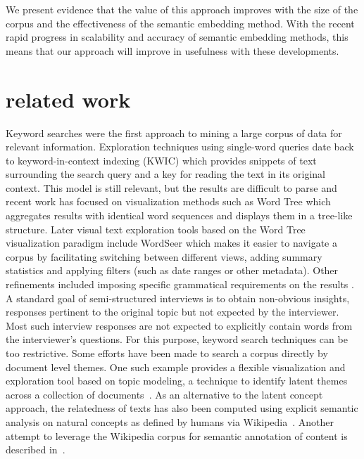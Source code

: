 \documentclass{sigchi}
\begin{document}
We present evidence that the value of this approach improves with the size of the corpus and the
effectiveness of the semantic embedding method. With the recent rapid progress in scalability and
accuracy of semantic embedding methods, this means that our approach will improve in usefulness
with these developments. 

\section{related work}

Keyword searches were the first approach to mining a large corpus of data for relevant information. Exploration techniques using single-word queries date back to keyword-in-context indexing (KWIC) \cite{luhn60, fischer66} which provides snippets of text surrounding the search query and a key for reading the text in its original context. This model is still relevant, but the results are difficult to parse and recent work has focused on visualization methods such as Word Tree \cite{wattenberg08} which aggregates results with identical word sequences and displays them in a tree-like structure. Later visual text exploration tools based on the Word Tree visualization paradigm include WordSeer \cite{muralidharan13}  which makes it easier to navigate a corpus by facilitating switching between different views, adding summary statistics and applying filters (such as date ranges or other metadata). Other refinements included imposing specific grammatical requirements on the results \cite{muralidharan13b}.\\

A standard goal of semi-structured interviews is to obtain non-obvious insights, responses pertinent to the original topic but not expected by the interviewer. Most such interview responses are not expected to explicitly contain words from the interviewer's questions. For this purpose, keyword search techniques can be too restrictive. Some efforts have been made to search a corpus directly by document level themes. One such example provides a flexible visualization and exploration tool \cite{eisenstein12} based on topic modeling, a technique to identify latent themes across a collection of documents~\cite{blei12}. As an alternative to the latent concept approach, the relatedness of texts has also been computed using explicit semantic analysis on natural concepts as defined by humans via Wikipedia~\cite{gabrilovich07}. Another attempt to leverage the Wikipedia corpus for semantic annotation of content is described in~\cite{mihalcea07}.
\end{document}
